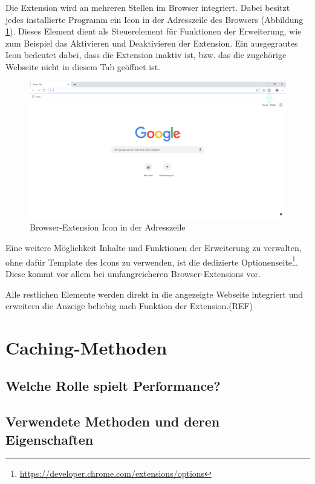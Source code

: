 Die Extension wird an mehreren Stellen im Browser integriert. Dabei besitzt jedes installierte Programm ein Icon in der Adresszeile des Browsers (Abbildung \ref{browser1}). Dieses Element dient als Steuerelement für Funktionen der Erweiterung, wie zum Beispiel das Aktivieren und Deaktivieren der Extension. Ein ausgegrautes Icon bedeutet dabei, dass die Extension inaktiv ist, bzw. das die zugehörige Webseite nicht in diesem Tab geöffnet ist.
\begin{figure}[ht]
	\centering
	\includegraphics[width=1\textwidth]{pics/browser1.png}
	\caption{Browser-Extension Icon in der Adresszeile}
	\label{browser1}
\end{figure}

Eine weitere Möglichkeit Inhalte und Funktionen der Erweiterung zu verwalten, ohne dafür Template des Icons zu verwenden, ist die dedizierte Optionenseite\footnote{\url{https://developer.chrome.com/extensions/options}}. Diese kommt vor allem bei umfangreicheren Browser-Extensions vor.

Alle restlichen Elemente werden direkt in die angezeigte Webseite integriert und erweitern die Anzeige beliebig nach Funktion der Extension.(REF)
\section{Caching-Methoden}
\label{s:cachingmethoden}

\subsection{Welche Rolle spielt Performance?}
\label{ss:rolleperformance}

\subsection{Verwendete Methoden und deren Eigenschaften}
\label{ss:methodeneigenschaften}



















